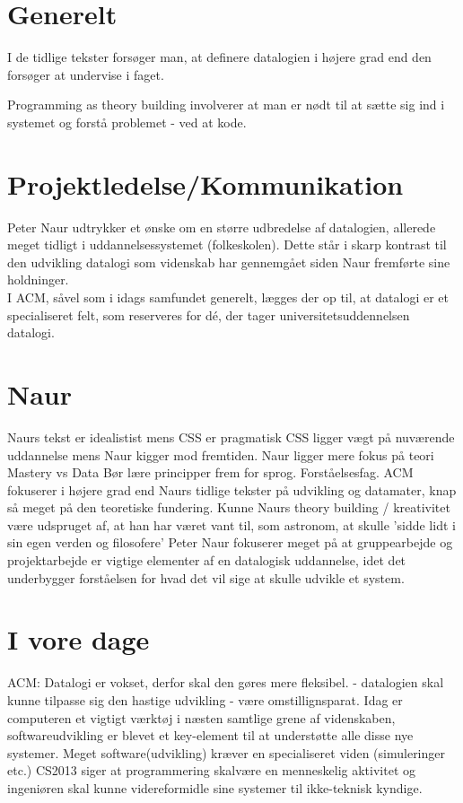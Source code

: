 

\section{Generelt}
I de tidlige tekster forsøger man, at definere datalogien i højere grad end den forsøger at undervise i faget.

Programming as theory building involverer at man er nødt til at sætte sig ind i systemet og forstå problemet - ved at
kode.



\section{Projektledelse/Kommunikation}
Peter Naur udtrykker et ønske om en større udbredelse af datalogien, allerede
meget tidligt i uddannelsessystemet (folkeskolen). Dette står i skarp kontrast
til den udvikling datalogi som videnskab har gennemgået siden Naur fremførte sine
holdninger.\\
I ACM, såvel som i idags samfundet generelt, lægges der op til, at datalogi er et
specialiseret felt, som reserveres for dé, der tager universitetsuddennelsen
datalogi.

\section{Naur}
Naurs tekst er idealistist mens CSS er pragmatisk
CSS ligger vægt på nuværende uddannelse mens Naur kigger mod fremtiden.
Naur ligger mere fokus på teori
Mastery vs Data
Bør lære principper frem for sprog. Forståelsesfag.
ACM fokuserer i højere grad end Naurs tidlige tekster på udvikling og datamater, knap så
meget på den teoretiske fundering.
Kunne Naurs theory building / kreativitet være udspruget af, at han har været vant til, som astronom, at skulle
'sidde lidt i sin egen verden og filosofere'
Peter Naur fokuserer meget på at gruppearbejde og projektarbejde er vigtige elementer af en datalogisk uddannelse,
idet det underbygger forståelsen for hvad det vil sige at skulle udvikle et system.


\section{I vore dage}
ACM: Datalogi er vokset, derfor skal den gøres mere fleksibel.
        - datalogien skal kunne tilpasse sig den hastige udvikling - være omstillignsparat.
Idag er computeren et vigtigt værktøj i næsten samtlige grene af videnskaben,
softwareudvikling er blevet et key-element til at understøtte alle disse nye
systemer.
Meget software(udvikling) kræver en specialiseret viden (simuleringer etc.)
CS2013 siger at programmering skalvære en menneskelig aktivitet og ingeniøren skal kunne videreformidle sine systemer til ikke-teknisk kyndige.

